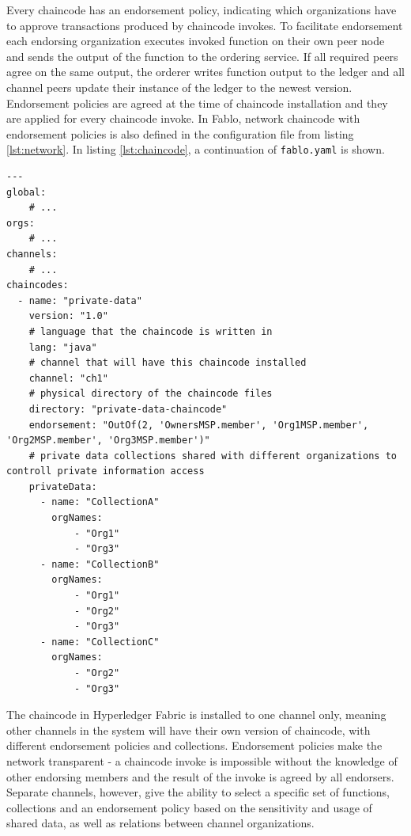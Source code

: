 \documentclass[12pt]{article}
\begin{document}
    Every chaincode has an endorsement policy, indicating which organizations have to approve transactions produced by chaincode invokes. To facilitate endorsement each endorsing organization executes invoked function on their own peer node and sends the output of the function to the ordering service. If all required peers agree on the same output, the orderer writes function output to the ledger and all channel peers update their instance of the ledger to the newest version. Endorsement policies are agreed at the time of chaincode installation and they are applied for every chaincode invoke. In Fablo, network chaincode with endorsement policies is also defined in the configuration file from listing \ref{lst:network}. In listing \ref{lst:chaincode}, a continuation of \lstinline{fablo.yaml} is shown.

    \begin{lstlisting}[style=yaml,
        caption={fablo.yaml - configuration file defining network chaincode}, label={lst:chaincode}]
---
global:
    # ...
orgs:
    # ...
channels:
    # ...
chaincodes:
  - name: "private-data"
    version: "1.0"
    # language that the chaincode is written in
    lang: "java"
    # channel that will have this chaincode installed
    channel: "ch1"
    # physical directory of the chaincode files
    directory: "private-data-chaincode"
    endorsement: "OutOf(2, 'OwnersMSP.member', 'Org1MSP.member', 'Org2MSP.member', 'Org3MSP.member')"
    # private data collections shared with different organizations to controll private information access
    privateData:
      - name: "CollectionA"
        orgNames:
            - "Org1"
            - "Org3"
      - name: "CollectionB"
        orgNames:
            - "Org1"
            - "Org2"
            - "Org3"
      - name: "CollectionC"
        orgNames:
            - "Org2"
            - "Org3"
    \end{lstlisting}

    The chaincode in Hyperledger Fabric is installed to one channel only, meaning other channels in the system will have their own version of chaincode, with different endorsement policies and collections. Endorsement policies make the network transparent - a chaincode invoke is impossible without the knowledge of other endorsing members and the result of the invoke is agreed by all endorsers. Separate channels, however, give the ability to select a specific set of functions, collections and an endorsement policy based on the sensitivity and usage of shared data, as well as relations between channel organizations.
\end{document}
